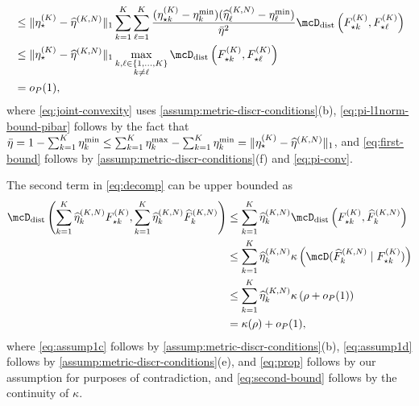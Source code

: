 \begin{align}
	 & \le \Vert \eta^{(\numcomps)}_{\star} - \widehat{\eta}^{(\numcomps,\numobs)}\Vert_{1} \sum_{k = 1}^{\numcomps} \sum_{\ell = 1}^{\numcomps} \frac{(\eta^{(\numcomps)}_{\star k}-\eta_k^{\min})(\widehat{\eta}_\ell^{(\numcomps, \numobs)} -  \eta_\ell^{\min}) }{\bar{\eta}^2} \distDisc\left(F^{(\numcomps)}_{\star k}, F^{(\numcomps)}_{\star \ell}\right)\\
	 & \le \Vert \eta^{(\numcomps)}_{\star} - \widehat{\eta}^{(\numcomps,\numobs)}\Vert_{1} \max_{\substack{k,\ell\in \{1,\ldots,K\} \\ 
   k\neq \ell}} \distDisc\left(F^{(\numcomps)}_{\star k}, F^{(\numcomps)}_{\star \ell}\right) \\
	 & = \op(1), \label{eq:first-bound}
\end{align}
where \cref{eq:joint-convexity} uses  \cref{assump:metric-discr-conditions}(b), \cref{eq:pi-l1norm-bound-pibar} follows by the fact that $\bar{\eta}=1- \sum_{k=1}^{K}\eta_k^{\min} \le  \sum_{k=1}^{K}\eta_k^{\max}-\sum_{k=1}^{K}\eta_k^{\min}=\Vert \eta^{(K)}_{\star} - \widehat{\eta}^{(K,N)} \Vert_{1}$, and \cref{eq:first-bound} follows by  \cref{assump:metric-discr-conditions}(f) and \cref{eq:pi-conv}.

The second term in \cref{eq:decomp} can be upper bounded as
\begin{align}
	\distDisc\left(\sum_{k = 1}^{\numcomps}  \widehat{\eta}_k^{(\numcomps, \numobs)} F^{(\numcomps)}_{\star k}, \sum_{k=1}^{\numcomps}\widehat{\eta}_k^{(\numcomps, \numobs)} \widehat{F}_k^{(\numcomps, \numobs)}\right)
	 & \le   \sum_{k = 1}^{\numcomps}  \widehat{\eta}_k^{(\numcomps, \numobs)}\distDisc\left( F^{(\numcomps)}_{\star k},  \widehat{F}_k^{(\numcomps, \numobs)}\right)  \label{eq:assump1c}          \\
	 & \le   \sum_{k = 1}^{\numcomps}  \widehat{\eta}_k^{(\numcomps, \numobs)}\kappa\left(\discr{\widehat{F}_k^{(\numcomps, \numobs)}}{F^{(\numcomps)}_{\star k}}\right)  \label{eq:assump1d} \\
	 & \le  \sum_{k = 1}^{\numcomps}  \widehat{\eta}_k^{(\numcomps, \numobs)}\kappa\left(\rho + \op(1) \right) \label{eq:prop}                                                                     \\
	 & = \kappa(\rho) + \op(1) \label{eq:second-bound},
\end{align}
where %
\cref{eq:assump1c} follows by  \cref{assump:metric-discr-conditions}(b),
\cref{eq:assump1d} follows by  \cref{assump:metric-discr-conditions}(e), and
\cref{eq:prop} follows by our assumption for purposes of contradiction, and  \cref{eq:second-bound} follows by the continuity of $\kappa$. %

